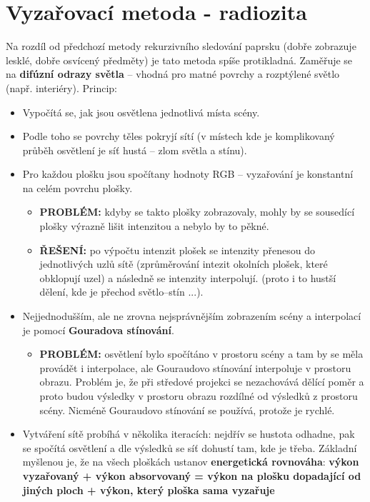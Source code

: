 \section{Vyzařovací metoda - radiozita}
Na rozdíl od předchozí metody rekurzivního sledování paprsku (dobře zobrazuje lesklé, dobře osvícený předměty) je tato metoda spíše protikladná. Zaměřuje se na \textbf{difúzní odrazy světla} -- vhodná pro matné povrchy a rozptýlené světlo (např. interiéry). Princip:
\begin{itemize}
    \item Vypočítá se, jak jsou osvětlena jednotlivá místa scény.
    \item Podle toho se povrchy těles pokryjí sítí (v místech kde je komplikovaný průběh osvětlení je síť hustá -- zlom světla a stínu).
    \item Pro každou plošku jsou spočítany hodnoty RGB -- vyzařování je konstantní na celém povrchu plošky.
          \begin{itemize}
              \item \textbf{PROBLÉM:} kdyby se takto plošky zobrazovaly, mohly by se sousedící plošky výrazně lišit intenzitou a nebylo by to pěkné.
              \item 	\textbf{ŘEŠENÍ:} po výpočtu intenzit plošek se intenzity přenesou do jednotlivých uzlů sítě (zprůměrování intezit okolních plošek, které obklopují uzel) a následně se intenzity interpolují. (proto i to hustší dělení, kde je přechod světlo--stín ...).
          \end{itemize}
    \item Nejjednodušším, ale ne zrovna nejsprávnějším zobrazením scény a interpolací je pomocí \textbf{Gouradova stínování}.
          \begin{itemize}
              \item 	\textbf{PROBLÉM:} osvětlení bylo spočítáno v prostoru scény a tam by se měla provádět i interpolace, ale Gouraudovo stínování interpoluje v prostoru obrazu. Problém je, že při středové projekci se nezachovává dělící poměr a proto budou výsledky v prostoru obrazu rozdílné od výsledků z prostoru scény. Nicméně Gouraudovo stínování se používá, protože je rychlé.
          \end{itemize}
    \item Vytváření sítě probíhá v několika iteracích: nejdřív se hustota odhadne, pak se spočítá osvětlení a dle výsledků se síť dohustí tam, kde je třeba. Základní myšlenou je, že na všech ploškách ustanov \textbf{energetická rovnováha}: \textbf{ výkon vyzařovaný + výkon absorvovaný = výkon na plošku dopadající od jiných ploch + výkon, který ploška sama vyzařuje}
\end{itemize}
